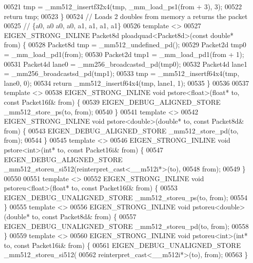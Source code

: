 \begin{DoxyCode}
00521   tmp = \_mm512\_insertf32x4(tmp, \_mm\_load\_ps1(from + 3), 3);
00522   \textcolor{keywordflow}{return} tmp;
00523 \}
00524 \textcolor{comment}{// Loads 2 doubles from memory a returns the packet}
00525 \textcolor{comment}{// \{a0, a0  a0, a0, a1, a1, a1, a1\}}
00526 \textcolor{keyword}{template} <>
00527 EIGEN\_STRONG\_INLINE Packet8d ploadquad<Packet8d>(\textcolor{keyword}{const} \textcolor{keywordtype}{double}* from) \{
00528   Packet8d tmp = \_mm512\_undefined\_pd();
00529   Packet2d tmp0 = \_mm\_load\_pd1(from);
00530   Packet2d tmp1 = \_mm\_load\_pd1(from + 1);
00531   Packet4d lane0 = \_mm256\_broadcastsd\_pd(tmp0);
00532   Packet4d lane1 = \_mm256\_broadcastsd\_pd(tmp1);
00533   tmp = \_mm512\_insertf64x4(tmp, lane0, 0);
00534   \textcolor{keywordflow}{return} \_mm512\_insertf64x4(tmp, lane1, 1);
00535 \}
00536 
00537 \textcolor{keyword}{template} <>
00538 EIGEN\_STRONG\_INLINE \textcolor{keywordtype}{void} pstore<float>(\textcolor{keywordtype}{float}* to, \textcolor{keyword}{const} Packet16f& from) \{
00539   EIGEN\_DEBUG\_ALIGNED\_STORE \_mm512\_store\_ps(to, from);
00540 \}
00541 \textcolor{keyword}{template} <>
00542 EIGEN\_STRONG\_INLINE \textcolor{keywordtype}{void} pstore<double>(\textcolor{keywordtype}{double}* to, \textcolor{keyword}{const} Packet8d& from) \{
00543   EIGEN\_DEBUG\_ALIGNED\_STORE \_mm512\_store\_pd(to, from);
00544 \}
00545 \textcolor{keyword}{template} <>
00546 EIGEN\_STRONG\_INLINE \textcolor{keywordtype}{void} pstore<int>(\textcolor{keywordtype}{int}* to, \textcolor{keyword}{const} Packet16i& from) \{
00547   EIGEN\_DEBUG\_ALIGNED\_STORE \_mm512\_storeu\_si512(reinterpret\_cast<\_\_m512i*>(to),
00548                                                 from);
00549 \}
00550 
00551 \textcolor{keyword}{template} <>
00552 EIGEN\_STRONG\_INLINE \textcolor{keywordtype}{void} pstoreu<float>(\textcolor{keywordtype}{float}* to, \textcolor{keyword}{const} Packet16f& from) \{
00553   EIGEN\_DEBUG\_UNALIGNED\_STORE \_mm512\_storeu\_ps(to, from);
00554 \}
00555 \textcolor{keyword}{template} <>
00556 EIGEN\_STRONG\_INLINE \textcolor{keywordtype}{void} pstoreu<double>(\textcolor{keywordtype}{double}* to, \textcolor{keyword}{const} Packet8d& from) \{
00557   EIGEN\_DEBUG\_UNALIGNED\_STORE \_mm512\_storeu\_pd(to, from);
00558 \}
00559 \textcolor{keyword}{template} <>
00560 EIGEN\_STRONG\_INLINE \textcolor{keywordtype}{void} pstoreu<int>(\textcolor{keywordtype}{int}* to, \textcolor{keyword}{const} Packet16i& from) \{
00561   EIGEN\_DEBUG\_UNALIGNED\_STORE \_mm512\_storeu\_si512(
00562       reinterpret\_cast<\_\_m512i*>(to), from);
00563 \}

\end{DoxyCode}
